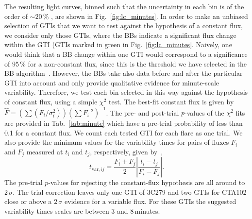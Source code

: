 \documentclass[twocolumn,linenumbers]{aastex62}
\begin{document}
The resulting light curves, binned such that the uncertainty in each bin is of the order of $\sim20\,\%$ \citep[using the adaptive binning introduced by][]{lott2012}, are shown in Fig.~\ref{fig:lc_minutes}. 
In order to make an unbiased selection of GTIs that we want to test against the hypothesis of a constant flux, we consider only those GTIs, where the BBs indicate a significant flux change within the GTI (GTIs marked in green in Fig.~\ref{fig:lc_minutes}.
Naively, one would think that a BB change within one GTI would correspond to a significance of 95\,\% for a non-constant flux, since this is the threshold we have selected in the BB algorithm~\citep{2013ApJ...764..167S}. However, the BBs take also data  before and after the particular GTI into account and only provide qualitative evidence for minute-scale variability. 
Therefore, we test each bin selected in this way against the hypothesis of constant flux, using a simple $\chi^2$ test. 
The best-fit constant flux is given by $\hat{F} = (\sum (F_i / \sigma_i^2))(\sum F_i^{-2})^{-1}$. 
The pre- and post-trial $p$-values of the $\chi^2$ fits are provided in Tab.~\ref{tab:minute} which have a pre-trial probability of less than 0.1 for a constant flux. We count each tested GTI for each flare as one trial. 
We also provide the minimum values for the variability times for pairs of fluxes $F_i$ and $F_j$ measured at $t_i$ and $t_j$, respectively, given by~\citet{1999ApJ...527..719Z},
\begin{equation}
t_{\mathrm{var},ij} = \frac{F_i + F_j}{2}\left|\frac{t_i - t_j}{F_i - F_j}\right|.
\end{equation}
The pre-trial $p$-values for rejecting the constant-flux hypothesis are all around to $2\,\sigma$. 
The trial correction leaves only one GTI of 3C279 and two GTIs for CTA102 close or above a $2\,\sigma$ evidence for a variable flux. 
For these GTIs the suggested variability times scales are between 3 and 8\,minutes.
\end{document}
